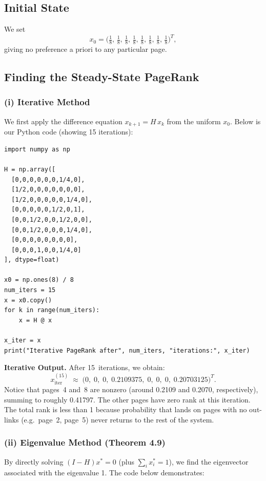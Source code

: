 \documentclass{article}
\begin{document}
\subsection{Initial State}

We set 
\[
  x_0 
  = 
  \bigl(
     \tfrac{1}{8},\, \tfrac{1}{8},\, \tfrac{1}{8},\, \tfrac{1}{8},\,
     \tfrac{1}{8},\, \tfrac{1}{8},\, \tfrac{1}{8},\, \tfrac{1}{8}
  \bigr)^T,
\]
giving no preference a priori to any particular page.

\subsection{Finding the Steady-State PageRank}

\subsubsection{(i) Iterative Method}
We first apply the difference equation $x_{k+1} = H\,x_k$ from the uniform $x_0$. 
Below is our Python code (showing 15 iterations):
\begin{verbatim}
import numpy as np

H = np.array([
  [0,0,0,0,0,0,1/4,0],
  [1/2,0,0,0,0,0,0,0],
  [1/2,0,0,0,0,0,1/4,0],
  [0,0,0,0,0,1/2,0,1],
  [0,0,1/2,0,0,1/2,0,0],
  [0,0,1/2,0,0,0,1/4,0],
  [0,0,0,0,0,0,0,0],
  [0,0,0,1,0,0,1/4,0]
], dtype=float)

x0 = np.ones(8) / 8
num_iters = 15
x = x0.copy()
for k in range(num_iters):
    x = H @ x

x_iter = x
print("Iterative PageRank after", num_iters, "iterations:", x_iter)
\end{verbatim}

\noindent
\textbf{Iterative Output.} After 15~iterations, we obtain:
\[
  x_{\mathrm{iter}}^{(15)} 
  \;\approx\;
  \bigl(
    0,\; 0,\; 0,\; 0.2109375,\; 0,\; 0,\; 0,\; 0.20703125
  \bigr)^T.
\]
Notice that pages~4 and~8 are nonzero (around 0.2109 and 0.2070, respectively), summing 
to roughly 0.41797.  The other pages have zero rank at this iteration.  The total rank 
is less than 1 because probability that lands on pages with no out-links (e.g.\ page~2, 
page~5) never returns to the rest of the system.

\subsubsection{(ii) Eigenvalue Method (Theorem 4.9)}
By directly solving $(I - H)x^*=0$ (plus $\sum_i x_i^*=1$), we find the eigenvector 
associated with the eigenvalue 1.  The code below demonstrates:
\end{document}
